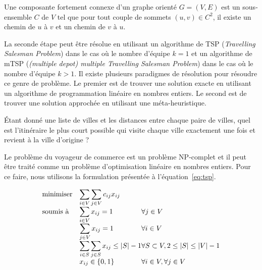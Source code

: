 \documentclass[francais,RandD]{rapportPFE}
\begin{document}
				\begin{Definition}
					\label{def:scc}
					Une composante fortement connexe d'un graphe orienté $G = (V, E)$ est un sous-ensemble $C$ de $V$ tel que pour tout couple de sommets $(u, v) \in C^2$, il existe un chemin de $u$ à $v$ et un chemin de $v$ à $u$.
				\end{Definition}

				La seconde étape peut être résolue en utilisant un algorithme de TSP (\textit{Travelling Salesman Problem}) dans le cas où le nombre d'équipe $k = 1$ et un algorithme de mTSP (\textit{(multiple depot) multiple Travelling Salesman Problem}) dans le cas où le nombre d'équipe $k > 1$.
				Il existe plusieurs paradigmes de résolution pour résoudre ce genre de problème.
				Le premier est de trouver une solution exacte en utilisant un algorithme de programmation linéaire en nombres entiers.
				Le second est de trouver une solution approchée en utilisant une méta-heuristique.

				\begin{Definition}
					\label{def:tsp}
					Étant donné une liste de villes et les distances entre chaque paire de villes, quel est l'itinéraire le plus court possible qui visite chaque ville exactement une fois et revient à la ville d'origine ?
				\end{Definition}

				Le problème du voyageur de commerce est un problème NP-complet et il peut être traité comme un problème d'optimisation linéaire en nombres entiers.
				Pour ce faire, nous utilisons la formulation présentée à l'équation~\ref{eq:tsp}.

				\begin{equation}
					\label{eq:tsp}
					\begin{array}{ll@{}ll}
						\text{minimiser}  & \displaystyle\sum\limits_{i \in V} \sum\limits_{j \in V} c_{ij} x_{ij} \\
						\text{soumis à}   & \displaystyle\sum\limits_{i \in V} x_{ij} = 1 & \forall j \in V\\
						& \displaystyle\sum\limits_{j \in V} x_{ij} = 1 & \forall i \in V\\
						& \displaystyle\sum\limits_{i \in S} \sum\limits_{j \in S} x_{ij} \leq |S| - 1 & \forall S \subset V, 2 \leq |S| \leq |V| - 1\\
						& x_{ij} \in \{0, 1\} & \forall i \in V, \forall j \in V\\
					\end{array}
				\end{equation}
\end{document}
